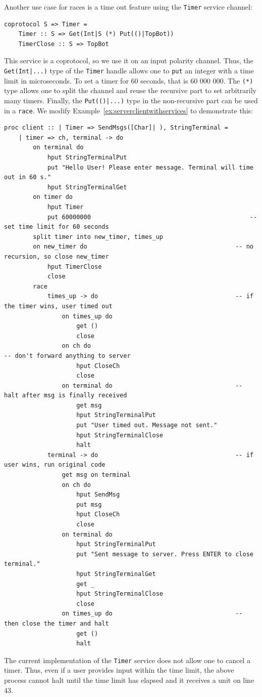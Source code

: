 \documentclass[11pt]{article}
\begin{document}
Another use case for races is a time out feature using the \lstinline{Timer} service channel:
\begin{lstlisting}
coprotocol S => Timer =
    Timer :: S => Get(Int|S (*) Put(()|TopBot))
    TimerClose :: S => TopBot 
\end{lstlisting}
This service is a coprotocol, so we use it on an input polarity channel.
Thus, the \lstinline{Get(Int|...)} type of the \lstinline{Timer} handle allows one to \lstinline{put} an integer with a time limit in microseconds.
To set a timer for 60 seconds, that is 60 000 000.
The \lstinline{(*)} type allows one to split the channel and reuse the recursive part to set arbitrarily many timers.
Finally, the \lstinline{Put(()|...)} type in the non-recursive part can be used in a \lstinline{race}.
We modify Example~\ref{ex:serverclientwithservices} to demonstrate this:
\begin{lstlisting}[label=ex:clienttimeout, caption=Client that times out the Terminal after 60 seconds.]
proc client :: | Timer => SendMsgs([Char]| ), StringTerminal =
	| timer => ch, terminal -> do
		on terminal do
			hput StringTerminalPut
			put "Hello User! Please enter message. Terminal will time out in 60 s."
			hput StringTerminalGet
		on timer do
			hput Timer
			put 60000000											-- set time limit for 60 seconds
		split timer into new_timer, times_up
		on new_timer do										 	-- no recursion, so close new_timer
			hput TimerClose
			close
		race
			times_up -> do										-- if the timer wins, user timed out
				on times_up do
					get ()
					close
				on ch do												-- don't forward anything to server
					hput CloseCh
					close
				on terminal do									-- halt after msg is finally received
					get msg
					hput StringTerminalPut
					put "User timed out. Message not sent."
					hput StringTerminalClose
					halt
			terminal -> do										-- if user wins, run original code
				get msg on terminal
				on ch do
					hput SendMsg
					put msg
					hput CloseCh
					close
				on terminal do
					hput StringTerminalPut
					put "Sent message to server. Press ENTER to close terminal."
					hput StringTerminalGet
					get _
					hput StringTerminalClose
					close
				on times_up do									-- then close the timer and halt
					get ()
					halt
\end{lstlisting}
The current implementation of the \lstinline{Timer} service does not allow one to cancel a timer.
Thus, even if a user provides input within the time limit, the above process cannot halt until the time limit has elapsed and it receives a unit on line 43.
\end{document}

